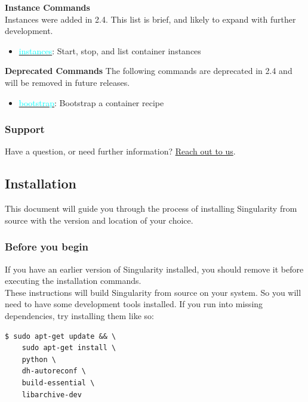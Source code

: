 \documentclass[a4paper]{article}
\newcounter{subsubsubsection}[subsubsection]
\begin{document}
\noindent\textbf{Instance Commands}
\\[0.2in]
\hfill Instances were added in 2.4. This list is brief, and likely to expand with further development.
\begin{itemize}
\item \hyperref[sec:instances]{{\textcolor{cyan}{instances}}}: Start, stop, and list 
container instances
\end{itemize}
\noindent\textbf{Deprecated Commands} The following commands are deprecated in 2.4 and will be removed in future releases.
\begin{itemize}
\item \hyperref[sec:bootstrap]{{\textcolor{cyan}{bootstrap}}}: Bootstrap a container recipe
\end{itemize}
\subsubsection{Support}

Have a question, or need further information? \href{http://singularity.lbl.gov/support}{Reach out to us}.

\subsection{Installation}
\label{sec:installation}

This document will guide you through the process of installing Singularity from source with the version and location of your choice.
\subsubsection{Before you begin}

If you have an earlier version of Singularity installed, you should remove it before executing the installation commands.
\\[0.1in]
These instructions will build Singularity from source on your system. So you will need to have some development tools installed. If you run into missing dependencies, try installing them like so:\\


\begin{lstlisting}[frame=single] 
$ sudo apt-get update && \
    sudo apt-get install \
    python \
    dh-autoreconf \
    build-essential \
    libarchive-dev 
\end{lstlisting}
\end{document}
